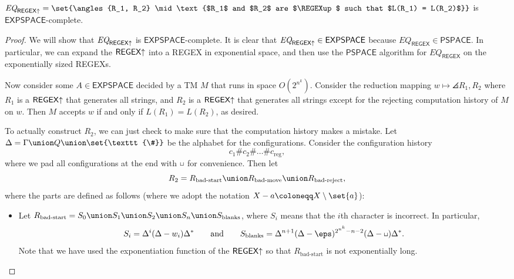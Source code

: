 \documentclass{standalone}
\begin{document}
\begin{theorem}
  \(\textit{EQ}_{\REGEXup} = \set{\angles{R_1, R_2} \mid \text{%
    $R_1$ and $R_2$ are $\REGEXup$ such that $L(R_1) = L(R_2)$%
  }}\) is \(\mathsf{EXPSPACE}\)-complete.
\end{theorem}
\begin{proof}
  We will show that \(\textit{EQ}_{\textsf{REGEX}\mathord\uparrow}\)
  is \(\mathsf{EXPSPACE}\)-complete.
  It is clear that \(\textit{EQ}_{\textsf{REGEX}\mathord\uparrow} \in \mathsf{EXPSPACE}\)
  because \(\textit{EQ}_{\textsf{REGEX}} \in \mathsf{PSPACE}\).
  In particular, we can expand the \(\textsf{REGEX}\mathord\uparrow\) into a \textsf{REGEX}
  in exponential space, and then use the \(\mathsf{PSPACE}\) algorithm for
  \(\textit{EQ}_{\textsf{REGEX}}\) on the exponentially sized \textsf{REGEX}s.

  Now consider some \(A \in \mathsf{EXPSPACE}\) decided by a \textsf{TM} \(M\)
  that runs in space \(O(2^{n^k})\).
  Consider the reduction mapping \(w \mapsto \angles{R_1, R_2}\)
  where \(R_1\) is a \(\textsf{REGEX}\mathord\uparrow\) that generates all strings,
  and \(R_2\) is a \(\textsf{REGEX}\mathord\uparrow\) that generates all strings
  except for the rejecting computation history of \(M\) on \(w\).
  Then \(M\) accepts \(w\) if and only if \(L(R_1) = L(R_2)\), as desired.

  To actually construct \(R_2\), we can just check to make sure
  that the computation history makes a mistake.
  Let \(\Delta = \Gamma \union Q \union \set{\texttt{\#}}\)
  be the alphabet for the configurations.
  Consider the configuration history
  \[
    c_1 \texttt{\#} c_2 \texttt{\#} \dots \texttt{\#} c_{\text{reg}},
  \]
  where we pad all configurations at the end with \(\blank\) for convenience.
  Then let
  \[
    R_2 = R_{\text{bad-start}} \union R_{\text{bad-move}}
                               \union R_{\text{bad-reject}},
  \]
  where the parts are defined as follows
  (where we adopt the notation \(X - a \coloneqq X \setminus \set{a}\)):
  \begin{itemize}
    \item Let
          \(R_{\text{bad-start}} =
            S_0 \union S_1 \union S_2 \union S_n \union S_{\text{blanks}}\),
          where \(S_i\) means that the \(i\)th character is incorrect.
          In particular,
          \[
            S_i = \Delta^i (\Delta - w_i) \Delta^*
              \qquad \text{and} \qquad
              S_{\text{blanks}} = \Delta^{n + 1}
                                  (\Delta - \eps)^{2^{n^k} - n - 2}
                                  (\Delta - \blank) \Delta^*.
          \]
          Note that we have used the exponentiation function of
          the \(\textsf{REGEX}\mathord\uparrow\) so that \(R_{\text{bad-start}}\) is not
          exponentially long.


\end{itemize}
\end{proof}
\end{document}
